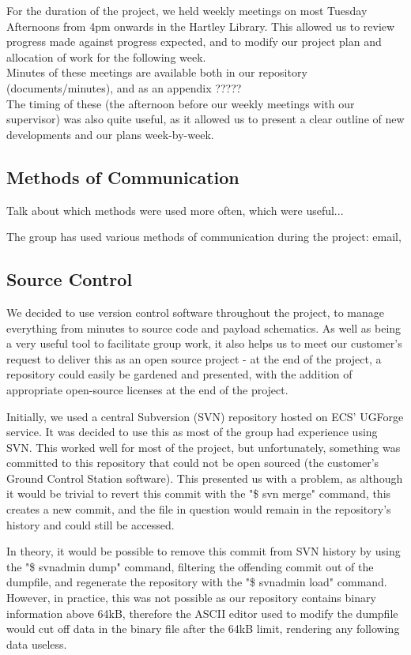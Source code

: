 For the duration of the project, we held weekly meetings on most Tuesday 
Afternoons from 4pm onwards in the Hartley Library. This allowed us to 
review progress made against progress expected, and to modify our project 
plan and allocation of work for the following week.
\\
Minutes of these meetings are available both in our repository \cite{github} 
(documents/minutes), and as an appendix ?????
\\
The timing of these (the afternoon before our weekly meetings with our 
supervisor) was also quite useful, as it allowed us to present a clear outline 
of new developments and our plans week-by-week.

\subsection{Methods of Communication}
Talk about which methods were used more often, which were useful...

The group has used various methods of communication during the project: 
email, 

\subsection{Source Control}

We decided to use version control software throughout the project, to manage 
everything from minutes to source code and payload schematics. As well as 
being a very useful tool to facilitate group work, it also helps us to meet 
our customer's request to deliver this as an open source project - at the end 
of the project, a repository could easily be gardened and presented, with the 
addition of appropriate open-source licenses at the end of the project.

Initially, we used a central Subversion (SVN) repository hosted on ECS' 
UGForge service. It was decided to use this as most of the group had 
experience using SVN. This worked well for most of the project, but 
unfortunately, something was committed to this repository that could not be 
open sourced (the customer's Ground Control Station software). This presented 
us with a problem, as although it would be trivial to revert this commit with 
the "\$ svn merge" command, this creates a new commit, and the file in 
question would remain in the repository's history and could still be accessed.

In theory, it would be possible to remove this commit from SVN history by 
using the "\$ svnadmin dump" command, filtering the offending commit out of 
the dumpfile, and regenerate the repository with the "\$ svnadmin load" 
command. However, in practice, this was not possible as our repository 
contains binary information above 64kB, therefore the ASCII editor used to 
modify the dumpfile would cut off data in the binary file after the 64kB 
limit, rendering any following data useless.

